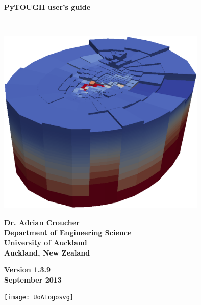 \begin{titlepage}

\begin{center}

\bigskip\

\textbf{\Huge{PyTOUGH user's guide}}

\bigskip\

\includegraphics[width=0.75\textwidth]{coverpic}

\bigskip

\textbf{\large{Dr. Adrian Croucher\\
Department of Engineering Science\\
University of Auckland\\
Auckland, New Zealand}}

\bigskip

\textbf{\large{Version 1.3.9\\
September 2013}}

\bigskip
\bigskip
\bigskip
\bigskip
\bigskip

\texttt{[image: UoALogosvg]}

\end{center}
\end{titlepage}

